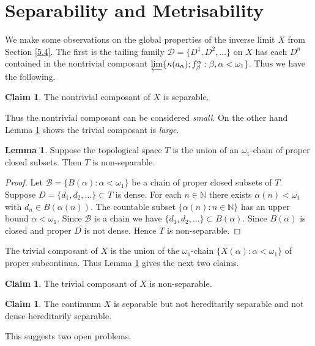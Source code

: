 \documentclass[12pt]{article}
\theoremstyle{plain}
\theoremstyle{definition}
\newtheorem{lemma}[theorem]{Lemma}
\newcounter{claim5counter}
\newtheorem{claim5}[claim5counter]{Claim}
\newcommand{\A}{\ensuremath{\alpha}}
\newcommand{\K}{\ensuremath{\kappa}}
\newcommand{\B}{\ensuremath{\beta}}
\newcommand{\W}{\ensuremath{\omega}}
\newcommand{\NN}{\ensuremath{\mathbb N}}
\newcommand{\0}{\ensuremath{\varnothing}}
\newcommand{\cD}{\ensuremath{\mathcal D}}
\newcommand{\cB}{\ensuremath{\mathcal B}}
\begin{document}
	\section{Separability and Metrisability}
	
	\noindent
	We make some observations on the global properties of the inverse limit $X$ from Section \ref{5.4}.
	The first is the tailing family $\cD = \{D^1, D^2, \ldots \}$ on $X$ has each $D^n$ contained in the nontrivial composant
	$\varprojlim \{\K(a_\A);f^\A_\B: \B,\A < \W_1\}$.
	Thus we have the following.
	
	\begin{claim5}\label{nontrivsep}
		The nontrivial composant of $X$ is separable.
	\end{claim5}
	
	Thus the nontrivial composant can be considered \textit{small}.
	On the other hand Lemma \ref{nonsep} shows the trivial composant is \textit{large}.
	
	\begin{lemma}\label{nonsep}
		Suppose the topological space $T$ is the union of an $\W_1$-chain of proper closed subsets.
		Then $T$ is non-separable.
	\end{lemma}
	
	\begin{proof}
		Let $\cB = \{B(\A): \A < \W_1 \}$ be a chain of proper closed subsets of $T$.
		Suppose $D = \{d_1,d_2,\ldots\} \subset T$ is dense.
		For each $n \in \NN$ there exists $\A(n) < \W_1$ with $d_n \in B(\A(n))$.
		The countable subset $\{\A(n): n \in \NN\}$ has an upper bound $\A < \W_1$.
		Since $\cB$ is a chain we have $\{d_1,d_2,\ldots\} \subset B(\A)$.
		Since $B(\A)$ is closed and proper $D$ is not dense.
		Hence $T$ is non-separable.
	\end{proof}
	
	The trivial composant of $X$ is the union of the $\W_1$-chain $\{X(\A): \A < \W_1 \}$ of proper subcontinua.
	Thus Lemma \ref{nonsep} gives the next two claims.
	
	\begin{claim5}\label{trivsep}
		The trivial composant of $X$ is non-separable.
	\end{claim5}
	
	\begin{claim5}
		The continuum $X$ is separable but not hereditarily separable and not dense-hereditarily separable. 
	\end{claim5}
	
	This suggests two open problems.
	
\end{document}
